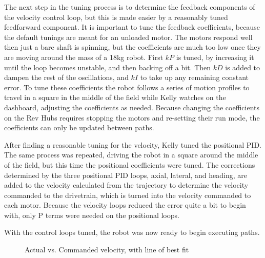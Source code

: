 \documentclass{article}
\begin{document}
The next step in the tuning process is to determine the feedback components of the velocity control loop, but this is made easier by a reasonably tuned feedforward component. It is important to tune the feedback coefficients, because the default tunings are meant for an unloaded motor. The motors respond well then just a bare shaft is spinning, but the coefficients are much too low once they are moving around the mass of a 18kg robot. First $kP$ is tuned, by increasing it until the loop becomes unstable, and then backing off a bit. Then $kD$ is added to dampen the rest of the oscillations, and $kI$ to take up any remaining constant error. To tune these coefficients the robot follows a series of motion profiles to travel in a square in the middle of the field while Kelly watches on the dashboard, adjusting the coefficients as needed. Because changing the coefficients on the Rev Hubs requires stopping the motors and re-setting their run mode, the coefficients can only be updated between paths.

After finding a reasonable tuning for the velocity, Kelly tuned the positional PID. The same process was repeated, driving the robot in a square around the middle of the field, but this time the positional coefficients were tuned. The corrections determined by the three positional PID loops, axial, lateral, and heading, are added to the velocity calculated from the trajectory to determine the velocity commanded to the drivetrain, which is turned into the velocity commanded to each motor. Because the velocity loops reduced the error quite a bit to begin with, only P terms were needed on the positional loops. 

With the control loops tuned, the robot was now ready to begin executing paths.

\begin {figure}
\centering
{}
\caption {Actual vs. Commanded velocity, with line of best fit}
\label {fig:graph}
\end{figure}
\end{document}
